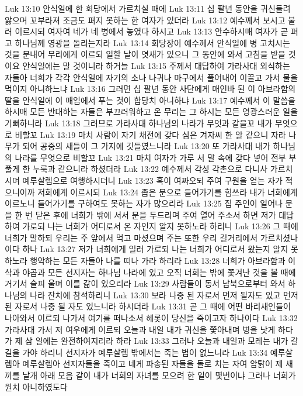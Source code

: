 Luk 13:10  안식일에 한 회당에서 가르치실 때에
Luk 13:11  십 팔년 동안을 귀신들려 앓으며 꼬부라져 조금도 펴지 못하는 한 여자가 있더라
Luk 13:12  예수께서 보시고 불러 이르시되 여자여 네가 네 병에서 놓였다 하시고
Luk 13:13  안수하시매 여자가 곧 펴고 하나님께 영광을 돌리는지라
Luk 13:14  회당장이 예수께서 안식일에 병 고치시는 것을 분내어 무리에게 이르되 일할 날이 엿새가 있으니 그 동안에 와서 고침을 받을 것이요 안식일에는 말 것이니라 하거늘
Luk 13:15  주께서 대답하여 가라사대 외식하는 자들아 너희가 각각 안식일에 자기의 소나 나귀나 마구에서 풀어내어 이끌고 가서 물을 먹이지 아니하느냐
Luk 13:16  그러면 십 팔년 동안 사단에게 매인바 된 이 아브라함의 딸을 안식일에 이 매임에서 푸는 것이 합당치 아니하냐
Luk 13:17  예수께서 이 말씀을 하시매 모든 반대하는 자들은 부끄러워하고 온 무리는 그 하시는 모든 영광스러운 일을 기뻐하니라
Luk 13:18  그러므로 가라사대 하나님의 나라가 무엇과 같을꼬 내가 무엇으로 비할꼬
Luk 13:19  마치 사람이 자기 채전에 갖다 심은 겨자씨 한 알 같으니 자라 나무가 되어 공중의 새들이 그 가지에 깃들였느니라
Luk 13:20  또 가라사대 내가 하나님의 나라를 무엇으로 비할꼬
Luk 13:21  마치 여자가 가루 서 말 속에 갖다 넣어 전부 부풀게 한 누룩과 같으니라 하셨더라
Luk 13:22  예수께서 각성 각촌으로 다니사 가르치시며 예루살렘으로 여행하시더니
Luk 13:23  혹이 여짜오되 주여 구원을 얻는 자가 적으니이까 저희에게 이르시되
Luk 13:24  좁은 문으로 들어가기를 힘쓰라 내가 너희에게 이르노니 들어가기를 구하여도 못하는 자가 많으리라
Luk 13:25  집 주인이 일어나 문을 한 번 닫은 후에 너희가 밖에 서서 문을 두드리며 주여 열어 주소서 하면 저가 대답하여 가로되 나는 너희가 어디로서 온 자인지 알지 못하노라 하리니
Luk 13:26  그 때에 너희가 말하되 우리는 주 앞에서 먹고 마셨으며 주는 또한 우리 길거리에서 가르치셨나이다 하나
Luk 13:27  저가 너희에게 일러 가로되 나는 너희가 어디로서 왔는지 알지 못하노라 행악하는 모든 자들아 나를 떠나 가라 하리라
Luk 13:28  너희가 아브라함과 이삭과 야곱과 모든 선지자는 하나님 나라에 있고 오직 너희는 밖에 쫓겨난 것을 볼 때에 거기서 슬피 울며 이를 갊이 있으리라
Luk 13:29  사람들이 동서 남북으로부터 와서 하나님의 나라 잔치에 참석하리니
Luk 13:30  보라 나중 된 자로서 먼저 될자도 있고 먼저 된 자로서 나중 될 자도 있느니라 하시더라
Luk 13:31  곧 그 때에 어떤 바리새인들이 나아와서 이르되 나가서 여기를 떠나소서 헤롯이 당신을 죽이고자 하나이다
Luk 13:32  가라사대 가서 저 여우에게 이르되 오늘과 내일 내가 귀신을 쫓아내며 병을 낫게 하다가 제 삼 일에는 완전하여지리라 하라
Luk 13:33  그러나 오늘과 내일과 모레는 내가 갈 길을 가야 하리니 선지자가 예루살렘 밖에서는 죽는 법이 없느니라
Luk 13:34  예루살렘아 예루살렘아 선지자들을 죽이고 네게 파송된 자들을 돌로 치는 자여 암탉이 제 새끼를 날개 아래 모음 같이 내가 너희의 자녀를 모으려 한 일이 몇번이냐 그러나 너희가 원치 아니하였도다
